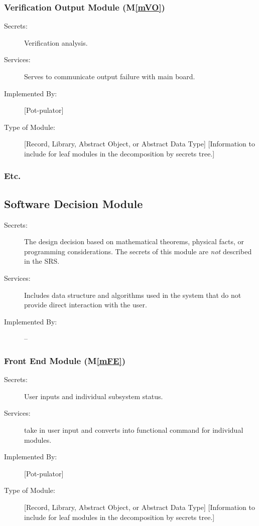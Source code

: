 \documentclass[12pt, titlepage]{article}
\newcommand{\mref}[1]{M\ref{#1}}
\begin{document}
\subsubsection{Verification Output Module (\mref{mVO})}
\begin{description}
\item[Secrets:] Verification analysis.
\item[Services:] Serves to communicate output failure with main board.
\item[Implemented By:] [Pot-pulator]
\item[Type of Module:] [Record, Library, Abstract Object, or Abstract Data Type]
  [Information to include for leaf modules in the decomposition by secrets tree.]
\end{description}




\subsubsection{Etc.}


\subsection{Software Decision Module}

\begin{description}
\item[Secrets:] The design decision based on mathematical theorems, physical
  facts, or programming considerations. The secrets of this module are
  \emph{not} described in the SRS.
\item[Services:] Includes data structure and algorithms used in the system that
  do not provide direct interaction with the user. 
\item[Implemented By:] --
\end{description}

\subsubsection{Front End Module (\mref{mFE})}
\begin{description}
\item[Secrets:] User inputs and individual subsystem status.
\item[Services:] take in user input and converts into functional command for individual modules.
\item[Implemented By:] [Pot-pulator]
\item[Type of Module:] [Record, Library, Abstract Object, or Abstract Data Type]
  [Information to include for leaf modules in the decomposition by secrets tree.]
\end{description}
\end{document}
